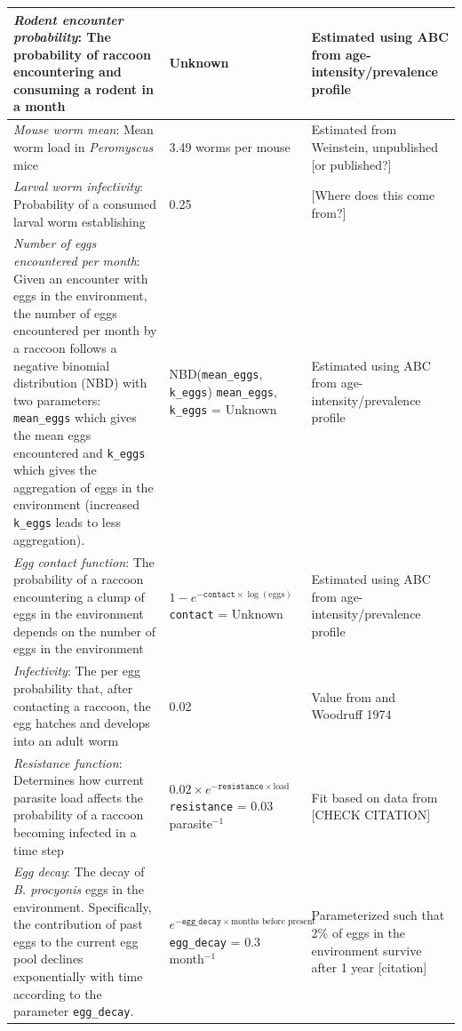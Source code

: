 \documentclass[11pt]{article}
\begin{document}
\begin{longtable}{p{4.5cm} p{4.5cm} p{5cm}}
\hline
\emph{Rodent encounter probability}: The probability of raccoon encountering and consuming a rodent in a month & Unknown & Estimated using ABC from age-intensity/prevalence profile \citep{Weinstein2016}\\
\hline
\emph{Mouse worm mean}: Mean worm load in \emph{Peromyscus} mice & 3.49 worms per mouse & Estimated from Weinstein, unpublished [or published?] \\
\hline
\emph{Larval worm infectivity}: Probability of a consumed larval worm establishing & 0.25 & [Where does this come from?] \\
\hline
\emph{Number of eggs encountered per month}: Given an encounter with eggs in the environment, the number of eggs encountered per month by a raccoon follows a negative binomial distribution (NBD) with two parameters: \texttt{mean\_eggs} which gives the mean eggs encountered and \texttt{k\_eggs} which gives the aggregation of eggs in the environment (increased \texttt{k\_eggs} leads to less aggregation). & NBD(\texttt{mean\_eggs}, \texttt{k\_eggs}) \newline\newline \texttt{mean\_eggs}, \texttt{k\_eggs} = Unknown & Estimated using ABC from age-intensity/prevalence profile \citep{Weinstein2016} \\
\hline
\emph{Egg contact function}: The probability of a raccoon encountering a clump of eggs in the environment depends on the number of eggs in the environment & $1 - e^{-\texttt{contact} \times \log(\text{eggs})}$ \newline\newline \texttt{contact} = Unknown & Estimated using ABC from age-intensity/prevalence profile \citep{Weinstein2016} \\ 
\hline
\emph{Infectivity}: The per egg probability that, after contacting a raccoon, the egg hatches and develops into an adult worm & 0.02 & Value from \cite{Croll1982} and Woodruff 1974  \\ 
\hline
\emph{Resistance function}: Determines how current parasite load affects the probability of a raccoon becoming infected in a time step &  $0.02 \times e^{-\texttt{resistance} \times \text{load}}$ \newline\newline \texttt{resistance} = 0.03 parasite$^{-1}$ & Fit based on data from \cite{Croll1982} [CHECK CITATION] \\
\hline
\emph{Egg decay}: The decay of \emph{B. procyonis} eggs in the environment. Specifically, the contribution of past eggs to the current egg pool declines exponentially with time according to the parameter \texttt{egg\_decay}. &  $e^{-\texttt{egg\_decay} \times \text{months before present}}$ \newline\newline \texttt{egg\_decay} = 0.3 month$^{-1}$ & Parameterized such that 2\% of eggs in the environment survive after 1 year [citation] \\

\end{longtable}
\end{document}

